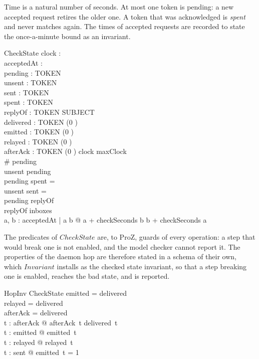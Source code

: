 \documentclass[a4paper,10pt,fleqn]{article}
\begin{document}
Time is a natural number of seconds.  At most one token is pending: a new
accepted request retires the older one.  A token that was acknowledged is
\emph{spent} and never matches again.  The times of accepted requests are
recorded to state the once-a-minute bound as an invariant.

\begin{schema}{CheckState}
  clock : \nat \\
  acceptedAt : \power \nat \\
  pending : \power TOKEN \\
  unsent : \power TOKEN \\
  sent : \power TOKEN \\
  spent : \power TOKEN \\
  replyOf : TOKEN \pfun SUBJECT \\
  delivered : TOKEN \pfun (0 ) \\
  emitted : TOKEN \pfun (0 ) \\
  relayed : TOKEN \pfun (0 ) \\
  afterAck : TOKEN \pfun (0 )
\where
  clock \leq maxClock \\
  \# pending  \\
  unsent \subseteq pending \\
  pending \cap spent = \emptyset \\
  unsent \cap sent = \emptyset \\
  pending \subseteq \dom replyOf \\
  \ran replyOf \subseteq inboxes \\
  \forall a, b : acceptedAt | a \neq b @ a + checkSeconds \leq b \lor b +
    checkSeconds \leq a
\end{schema}

The predicates of $CheckState$ are, to ProZ, guards of every operation: a step
that would break one is not enabled, and the model checker cannot report it.  The
properties of the daemon hop are therefore stated in a schema of their own, which
$Invariant$ installs as the checked state invariant, so that a step breaking one
is enabled, reaches the bad state, and is reported.

\begin{schema}{HopInv}
  CheckState
\where
  \dom emitted = \dom delivered \\
  \dom relayed = \dom delivered \\
  \dom afterAck = \dom delivered \\
  \forall t : \dom afterAck @ afterAck~t \leq delivered~t \\
  \forall t : \dom emitted @ emitted~t  \\
  \forall t : \dom relayed @ relayed~t  \\
  \forall t : sent @ emitted~t = 1
\end{schema}
\end{document}
